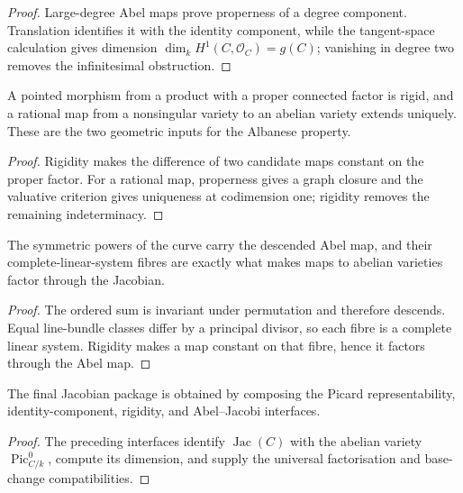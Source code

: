 \begin{proof}
  Large-degree Abel maps prove properness of a degree component.  Translation
  identifies it with the identity component, while the tangent-space
  calculation gives dimension \(\dim_k H^1(C,\mathcal O_C)=g(C)\); vanishing in
  degree two removes the infinitesimal obstruction.
\end{proof}

\begin{theorem}
  \label{mk-app-rigidity-interface}
  \cite{milne-av,mumford-av}
  A pointed morphism from a product with a proper connected factor is rigid,
  and a rational map from a nonsingular variety to an abelian variety extends
  uniquely.  These are the two geometric inputs for the Albanese property.
\end{theorem}

\begin{proof}
  Rigidity makes the difference of two candidate maps constant on the proper
  factor.  For a rational map, properness gives a graph closure and the
  valuative criterion gives uniqueness at codimension one; rigidity removes
  the remaining indeterminacy.
\end{proof}

\begin{proposition}
  \label{mk-app-symmetric-power-interface}
  \cite{milne-av}
  The symmetric powers of the curve carry the descended Abel map, and their
  complete-linear-system fibres are exactly what makes maps to abelian
  varieties factor through the Jacobian.
\end{proposition}

\begin{proof}
  The ordered sum is invariant under permutation and therefore descends.
  Equal line-bundle classes differ by a principal divisor, so each fibre is a
  complete linear system.  Rigidity makes a map constant on that fibre, hence
  it factors through the Abel map.
\end{proof}

\begin{theorem}
  \label{mk-app-jacobian-interface}
  \cite{milne-av,kleiman-picard}
  The final Jacobian package is obtained by composing the Picard
  representability, identity-component, rigidity, and Abel--Jacobi interfaces.
\end{theorem}

\begin{proof}
  The preceding interfaces identify \(\operatorname{Jac}(C)\) with the
  abelian variety \(\operatorname{Pic}^0_{C/k}\), compute its dimension, and
  supply the universal factorisation and base-change compatibilities.
\end{proof}
